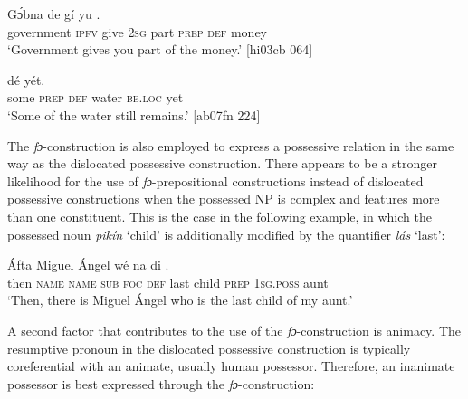 \ea%
    \label{ex:key:246}
    \gll Gɔ́bna    de  gí  yu        .\\
government  \textsc{ipfv}  give  \textsc{2sg}  part  \textsc{prep}  \textsc{def}  money\\

\glt ‘Government gives you part of the money.’ [hi03cb 064]
\z


\ea%
    \label{ex:key:247}
    \gll {}          dé    yét.\\
some  \textsc{prep}  \textsc{def}  water  \textsc{be.loc}  yet\\

\glt ‘Some of the water still remains.’ [ab07fn 224]
\z

The \textit{fɔ}{}-construction is also employed to express a possessive relation in the same way as the dislocated possessive construction. There appears to be a stronger likelihood for the use of \textit{fɔ}{}-prepositional constructions instead of dislocated possessive constructions when the possessed NP is complex and features more than one constituent. This is the case in the following example, in which the possessed noun \textit{pikín} ‘child’ is additionally modified by the quantifier \textit{lás} ‘last’: 


\ea%
    \label{ex:key:248}
    \gll \'{A}fta    Miguel  Ángel  wé  na  di            .\\
then  \textsc{name}  \textsc{name}  \textsc{sub}  \textsc{foc}  \textsc{def}  last  child  \textsc{prep}  \textsc{1sg.poss}  aunt\\

\glt ‘Then, there is Miguel Ángel who is the last child of my aunt.’ \textstylePichiexamplenumberZchnZchn{[fr03ft 143]}
\z

A second factor that contributes to the use of the \textit{fɔ}{}-construction is animacy. The resumptive pronoun in the dislocated possessive construction is typically coreferential with an animate, usually human possessor. Therefore, an inanimate possessor is best expressed through the \textit{fɔ}{}-construction: 


